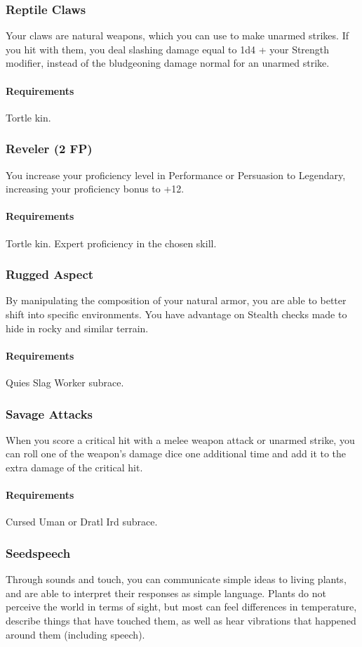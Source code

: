 \subsubsection{Reptile Claws} \label{feat::reptileclaws}
    Your claws are natural weapons, which you can use to make unarmed strikes.
    If you hit with them, you deal slashing damage equal to 1d4 + your Strength modifier, instead of the bludgeoning damage normal for an unarmed strike.
    \paragraph{Requirements} Tortle kin.
\subsubsection{Reveler (2 FP)} \label{feat::reveler}
    You increase your proficiency level in Performance or Persuasion to Legendary, increasing your proficiency bonus to +12.
    \paragraph{Requirements} Tortle kin. Expert proficiency in the chosen skill.
\subsubsection{Rugged Aspect} \label{feat::ruggedaspect}
    By manipulating the composition of your natural armor, you are able to better shift into specific environments.
    You have advantage on Stealth checks made to hide in rocky and similar terrain.
    \paragraph{Requirements} Quies Slag Worker subrace.
\subsubsection{Savage Attacks} \label{feat::savageattacks}
    When you score a critical hit with a melee weapon attack or unarmed strike, you can roll one of the weapon's damage dice one additional time and add it to the extra damage of the critical hit.
    \paragraph{Requirements} Cursed Uman or Dratl Ird subrace.
\subsubsection{Seedspeech} \label{feat::seedspeech}
    Through sounds and touch, you can communicate simple ideas to living plants, and are able to interpret their responses as simple language.
    Plants do not perceive the world in terms of sight, but most can feel differences in temperature, describe things that have touched them, as well as hear vibrations that happened around them (including speech).
